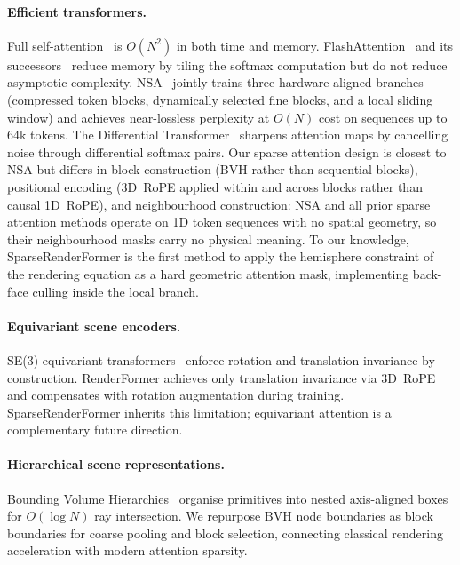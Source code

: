 \documentclass{egpubl}
\newcommand{\ours}{SparseRenderFormer\xspace}
\newcommand{\RF}{RenderFormer\xspace}
\begin{document}
\paragraph{Efficient transformers.}
Full self-attention~\cite{vaswani2017attention} is $O(N^2)$ in both time and memory.
FlashAttention~\cite{dao2022flashattention} and its successors~\cite{dao2023flashattention2,shah2024flashattention3}
reduce memory by tiling the softmax computation but do not reduce
asymptotic complexity.
NSA~\cite{yuan2025nsa} jointly trains three hardware-aligned branches
(compressed token blocks, dynamically selected fine blocks, and a local
sliding window) and achieves near-lossless perplexity at $O(N)$ cost
on sequences up to 64k tokens.
The Differential Transformer~\cite{ye2024differential} sharpens
attention maps by cancelling noise through differential softmax pairs.
Our sparse attention design is closest to NSA but differs in block
construction (BVH rather than sequential blocks), positional encoding
(3D~RoPE applied within and across blocks rather than causal 1D~RoPE),
and neighbourhood construction: NSA and all prior sparse attention methods
operate on 1D token sequences with no spatial geometry, so their
neighbourhood masks carry no physical meaning.
To our knowledge, \ours is the first method to apply the hemisphere constraint of the
rendering equation as a hard geometric attention mask, implementing
back-face culling inside the local branch.

\paragraph{Equivariant scene encoders.}
SE(3)-equivariant transformers~\cite{liao2023equiformerv2} enforce
rotation and translation invariance by construction.
\RF achieves only translation invariance via 3D~RoPE and compensates
with rotation augmentation during training.
\ours inherits this limitation; equivariant attention is a complementary
future direction.

\paragraph{Hierarchical scene representations.}
Bounding Volume Hierarchies~\cite{kajiya1986rendering} organise primitives
into nested axis-aligned boxes for $O(\log N)$ ray intersection.
We repurpose BVH node boundaries as block boundaries for coarse pooling
and block selection, connecting classical rendering acceleration with
modern attention sparsity.
\end{document}
